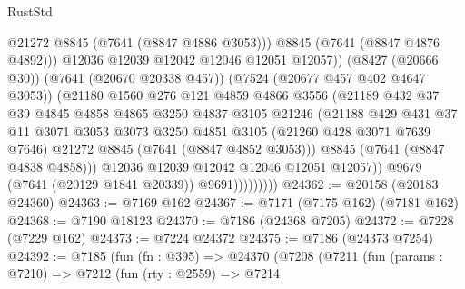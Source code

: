\begin{lexlean}{RustStd}
\begin{coremodule}
                                @21272
                                @8845
                                (@7641 (@8847 @4886 @3053)))
                              @8845
                              (@7641 (@8847 @4876 @4892)))
                            @12036
                            @12039
                            @12042
                            @12046
                            @12051
                            @12057))
                        (@8427 (@20666 @30))
                        (@7641 (@20670 @20338 @457))
                        (@7524 (@20677 @457 @402 @4647 @3053))
                        (@21180
                          @1560
                          @276
                          @121
                          @4859
                          @4866
                          @3556
                          (@21189
                            @432
                            @37
                            @39
                            @4845
                            @4858
                            @4865
                            @3250
                            @4837
                            @3105
                            @21246
                            (@21188
                              @429
                              @431
                              @37
                              @11
                              @3071
                              @3053
                              @3073
                              @3250
                              @4851
                              @3105
                              (@21260 @428 @3071 @7639 @7646)
                              @21272
                              @8845
                              (@7641 (@8847 @4852 @3053)))
                            @8845
                            (@7641 (@8847 @4838 @4858)))
                          @12036
                          @12039
                          @12042
                          @12046
                          @12051
                          @12057))
                      @9679
                      (@7641 (@20129 @1841 @20339))
                      @9691)))))))))
@24362 := @20158 (@20183 @24360)
@24363 := @7169 @162
@24367 := @7171 (@7175 @162) (@7181 @162)
@24368 := @7190 @18123
@24370 := @7186 (@24368 @7205)
@24372 := @7228 (@7229 @162)
@24373 := @7224 @24372
@24375 := @7186 (@24373 @7254)
@24392 := @7185
    (fun (fn : @395) =>
    @24370
      (@7208
        (@7211
          (fun (params : @7210) =>
          @7212
            (fun (rty : @2559) =>
            @7214

\end{coremodule}
\end{lexlean}
